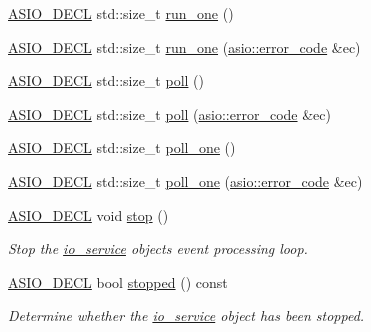 \begin{DoxyCompactItemize}
\hyperlink{config_8hpp_ab54d01ea04afeb9a8b39cfac467656b7}{A\+S\+I\+O\+\_\+\+D\+E\+C\+L} std\+::size\+\_\+t \hyperlink{classasio_1_1io__service_aa83c06ec5cc7bde25c64d89530998408}{run\+\_\+one} ()
\item 
\hyperlink{config_8hpp_ab54d01ea04afeb9a8b39cfac467656b7}{A\+S\+I\+O\+\_\+\+D\+E\+C\+L} std\+::size\+\_\+t \hyperlink{classasio_1_1io__service_aba3701b55997b636b3120d2b3da93561}{run\+\_\+one} (\hyperlink{classasio_1_1error__code}{asio\+::error\+\_\+code} \&ec)
\item 
\hyperlink{config_8hpp_ab54d01ea04afeb9a8b39cfac467656b7}{A\+S\+I\+O\+\_\+\+D\+E\+C\+L} std\+::size\+\_\+t \hyperlink{classasio_1_1io__service_afcc99e506862edaf34ac124c0e7f0242}{poll} ()
\item 
\hyperlink{config_8hpp_ab54d01ea04afeb9a8b39cfac467656b7}{A\+S\+I\+O\+\_\+\+D\+E\+C\+L} std\+::size\+\_\+t \hyperlink{classasio_1_1io__service_a600ee061d5c3b9a52fb61dbe1a4a4f1f}{poll} (\hyperlink{classasio_1_1error__code}{asio\+::error\+\_\+code} \&ec)
\item 
\hyperlink{config_8hpp_ab54d01ea04afeb9a8b39cfac467656b7}{A\+S\+I\+O\+\_\+\+D\+E\+C\+L} std\+::size\+\_\+t \hyperlink{classasio_1_1io__service_acbdbe60a4582f7f77f5bdb85d4e76013}{poll\+\_\+one} ()
\item 
\hyperlink{config_8hpp_ab54d01ea04afeb9a8b39cfac467656b7}{A\+S\+I\+O\+\_\+\+D\+E\+C\+L} std\+::size\+\_\+t \hyperlink{classasio_1_1io__service_a9728b97b8825a83c286ef1b630bd1dc1}{poll\+\_\+one} (\hyperlink{classasio_1_1error__code}{asio\+::error\+\_\+code} \&ec)
\item 
\hyperlink{config_8hpp_ab54d01ea04afeb9a8b39cfac467656b7}{A\+S\+I\+O\+\_\+\+D\+E\+C\+L} void \hyperlink{classasio_1_1io__service_afd2dad56dd1d0d1adfbcf4d9f1c3912f}{stop} ()
\begin{DoxyCompactList}\small\item\em Stop the \hyperlink{classasio_1_1io__service}{io\+\_\+service} object\textquotesingle{}s event processing loop. \end{DoxyCompactList}\item 
\hyperlink{config_8hpp_ab54d01ea04afeb9a8b39cfac467656b7}{A\+S\+I\+O\+\_\+\+D\+E\+C\+L} bool \hyperlink{classasio_1_1io__service_aff0b3c3231f7a1fb9156489fc19481e8}{stopped} () const 
\begin{DoxyCompactList}\small\item\em Determine whether the \hyperlink{classasio_1_1io__service}{io\+\_\+service} object has been stopped. \end{DoxyCompactList}\item 

\end{DoxyCompactItemize}

